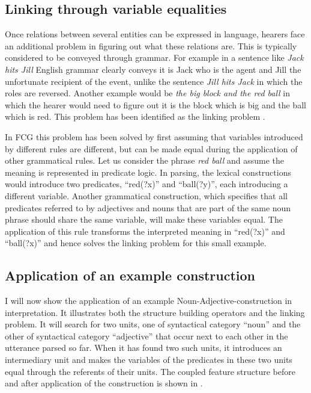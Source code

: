 \subsection{Linking through variable equalities}

Once relations between several entities can be expressed in language,
hearers face an additional problem in figuring out what these
relations are. This is typically considered to be conveyed through
grammar. For example in a sentence like \textit{Jack hits Jill} English
grammar clearly conveys it is Jack who is the agent and Jill the
unfortunate recipient of the event, unlike the sentence \textit{Jill hits
Jack} in which the roles are reversed. Another example would be \textit{the
big block and the red ball} in which the hearer would need to figure
out it is the block which is big and the ball which is red. This
problem has been identified as the linking problem
\citep{steels05linking}.

In FCG this problem has been solved by first assuming that variables
introduced by different rules are different, but can be made equal
during the application of other grammatical rules. Let us consider the
phrase \textit{red ball} and assume the meaning is represented in predicate
logic. In parsing, the lexical constructions would introduce two
predicates, ``red(?x)'' and ``ball(?y)'', each introducing a different
variable. Another grammatical construction, which specifies that all
predicates referred to by adjectives and nouns that are part of the
same noun phrase should share the same variable, will make these
variables equal. The application of this rule transforms the
interpreted meaning in ``red(?x)'' and ``ball(?x)'' and hence solves the
linking problem for this small example.

\subsection{Application of an example construction}

I will now show the application of an example
Noun-Adjective-construction in interpretation. It illustrates both the
structure building operators and the linking problem. It will search
for two units, one of syntactical category ``noun'' and the other
of syntactical category ``adjective'' that occur next to each other
in the utterance parsed so far. When it has found two such units, it
introduces an intermediary unit and makes the variables of the
predicates in these two units equal through the referents of their
units. The coupled feature structure before and after application of
the construction is shown in .

